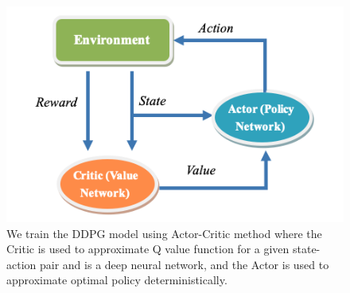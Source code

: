 \documentclass{article}
\begin{document}
\begin{figure}[h]
	\includegraphics[width=\linewidth]{ddpg_flow1.png}
	\caption{We train the DDPG model using Actor-Critic method where the Critic is used to approximate Q value function for a given state-action pair and is a deep neural network, and the Actor is used to approximate optimal policy deterministically.}
	\label{fig:ddpg_flow1}
\end{figure}
\end{document}
